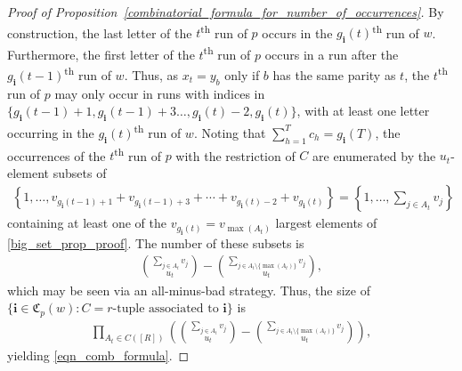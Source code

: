 \documentclass[11pt]{amsart}
\begin{document}
\begin{proof}[Proof of Proposition~\ref{combinatorial_formula_for_number_of_occurrences}]
    
    By construction, the last letter of the $t$\textsuperscript{th} run of $p$ occurs in the $g_{\mathbf{i}}(t)$\textsuperscript{th} run of $w$. Furthermore, the first letter of the $t$\textsuperscript{th} run of $p$ occurs in a run after the $g_{\mathbf{i}}(t-1)$\textsuperscript{th} run of $w$. Thus, as $x_t=y_b$ only if $b$ has the same parity as $t$, the $t$\textsuperscript{th} run of $p$ may only occur in runs with indices in $\{g_{\mathbf{i}}(t-1)+1,g_{\mathbf{i}}(t-1)+3\dots,g_{\mathbf{i}}(t)-2,g_{\mathbf{i}}(t)\}$, with at least one letter occurring in the $g_{\mathbf{i}}(t)$\textsuperscript{th} run of $w$. Noting that $\sum_{h=1}^{T}c_h=g_{\mathbf{i}}(T)$, the occurrences of the $t$\textsuperscript{th} run of $p$ with the restriction of $C$ are enumerated by the $u_t$-element subsets of
    \begin{align}\label{big_set_prop_proof}
        \left\{1,\dots,v_{g_{\mathbf{i}}(t-1)+1}+v_{g_{\mathbf{i}}(t-1)+3}+\cdots+v_{g_{\mathbf{i}}(t)-2}+v_{g_{\mathbf{i}}(t)}\right\}=\left\{1,\dots,\sum_{j\in A_t} v_j\right\}
    \end{align}
    containing at least one of the $v_{g_{\mathbf{i}}(t)}=v_{\max(A_t)}$ largest elements of \eqref{big_set_prop_proof}. The number of these subsets is
    \begin{align*}
        {\sum_{j\in A_t}v_{j}\choose u_t}-{\sum_{j\in A_t\setminus\{\max(A_t)\}}v_{j}\choose u_t},
    \end{align*}
    which may be seen via an all-minus-bad strategy. Thus, the size of $\{\mathbf{i}\in\mathfrak{C}_{p}(w):C=r\text{-tuple~associated~to~}\mathbf{i}\}$ is
    \begin{align}\label{complicated_summand}
        \prod_{A_t\in C([R])}\left({\sum_{j\in A_t}v_{j}\choose u_t}-{\sum_{j\in A_t\setminus\{\max(A_t)\}}v_{j}\choose u_t}\right),
    \end{align}
    yielding \eqref{eqn_comb_formula}.
\end{proof}
\end{document}
